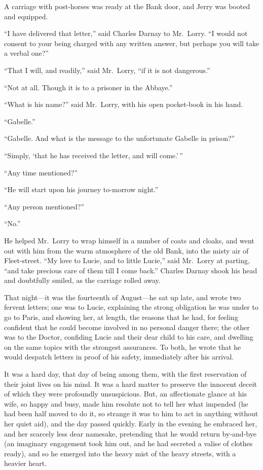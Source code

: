 A carriage with post-horses was ready at the Bank door, and Jerry
was booted and equipped.

``I have delivered that letter,'' said Charles Darnay to Mr.\ Lorry.
``I would not consent to your being charged with any written answer,
but perhaps you will take a verbal one?''

``That I will, and readily,'' said Mr.\ Lorry, ``if it is not dangerous.''

``Not at all.  Though it is to a prisoner in the Abbaye.''

``What is his name?'' said Mr.\ Lorry, with his open pocket-book in his hand.

``Gabelle.''

``Gabelle.  And what is the message to the unfortunate Gabelle in prison?''

``Simply, `that he has received the letter, and will come.'\,''

``Any time mentioned?''

``He will start upon his journey to-morrow night.''

``Any person mentioned?''

``No.''

He helped Mr.\ Lorry to wrap himself in a number of coats and cloaks,
and went out with him from the warm atmosphere of the old Bank, into
the misty air of Fleet-street.  ``My love to Lucie, and to little
Lucie,'' said Mr.\ Lorry at parting, ``and take precious care of them
till I come back.''  Charles Darnay shook his head and doubtfully smiled,
as the carriage rolled away.

That night---it was the fourteenth of August---he sat up late, and
wrote two fervent letters; one was to Lucie, explaining the strong
obligation he was under to go to Paris, and showing her, at length,
the reasons that he had, for feeling confident that he could become
involved in no personal danger there; the other was to the Doctor,
confiding Lucie and their dear child to his care, and dwelling on
the same topics with the strongest assurances.  To both, he wrote
that he would despatch letters in proof of his safety, immediately
after his arrival.

It was a hard day, that day of being among them, with the first
reservation of their joint lives on his mind.  It was a hard matter
to preserve the innocent deceit of which they were profoundly
unsuspicious.  But, an affectionate glance at his wife, so happy and
busy, made him resolute not to tell her what impended (he had been
half moved to do it, so strange it was to him to act in anything
without her quiet aid), and the day passed quickly.  Early in the
evening he embraced her, and her scarcely less dear namesake, pretending
that he would return by-and-bye (an imaginary engagement took him out,
and he had secreted a valise of clothes ready), and so he emerged
into the heavy mist of the heavy streets, with a heavier heart.


